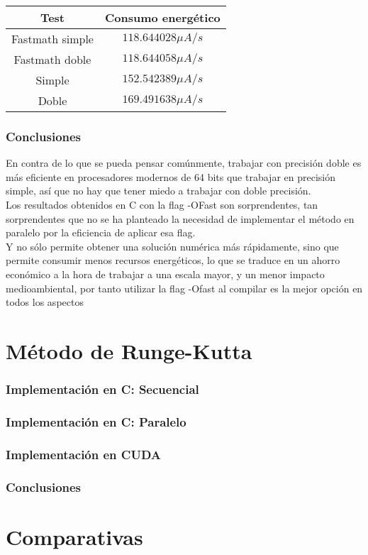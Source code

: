 \begin{ejemplo}
\begin{table}[H]
	\centering
	\begin{tabular}{|c|c|}
		\hline
		\textbf{Test}  & \textbf{Consumo energético}        \\ \hline
		Fastmath simple & $118.644028 \mu A/s$ \\ 
		Fastmath doble   & $118.644058 \mu A/s$ \\
		Simple & $ 152.542389 \mu A/s$ \\
		Doble & $ 169.491638 \mu A/s$ \\
		\hline
	\end{tabular}%
\end{table}
\subsubsection{Conclusiones}
En contra de lo que se pueda pensar comúnmente, trabajar con precisión doble es más eficiente en procesadores modernos de 64 bits que trabajar en precisión simple, así que no hay que tener miedo a trabajar con doble precisión. \\
Los resultados obtenidos en C con la flag -OFast son sorprendentes, tan sorprendentes que no se ha planteado la necesidad  de implementar el método en paralelo por la eficiencia de aplicar esa flag.
\\
Y no sólo permite obtener una solución numérica más rápidamente, sino que permite consumir menos recursos energéticos, lo que se traduce en un ahorro económico a la hora de trabajar a una escala mayor, y un menor impacto medioambiental, por tanto utilizar la flag -Ofast al compilar es la mejor opción en todos los aspectos
\end{ejemplo}

\section{Método de Runge-Kutta}
\subsubsection{Implementación en C: Secuencial}
\subsubsection{Implementación en C: Paralelo}
\subsubsection{Implementación en CUDA}
\subsubsection{Conclusiones}

\section{Comparativas}